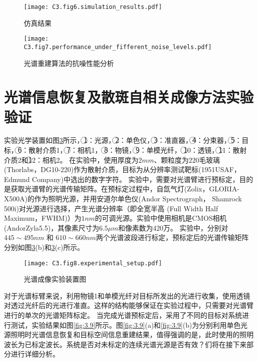 \begin{figure}[htp]
	\centering
	\texttt{[image: C3.fig6.simulation\_results.pdf]}
	\caption{仿真结果}
	\label{fig:3.6}
\end{figure}

\begin{figure}[htp]
	\centering
	\texttt{[image: C3.fig7.performance\_under\_fifferent\_noise\_levels.pdf]}
	\caption{光谱重建算法的抗噪性能分析}
	\label{fig:3.7}
\end{figure}

\section{光谱信息恢复及散斑自相关成像方法实验验证}

实验光学装置如图\ref{fig:3.8}所示，{\large \textcircled{\normalsize 1}}：光源，{\large \textcircled{\normalsize 2}}：单色仪，{\large \textcircled{\normalsize 3}}：准直器，{\large \textcircled{\normalsize 4}}：分束器，{\large \textcircled{\normalsize 5}}：目标，{\large \textcircled{\normalsize 6}}：散射介质1，{\large \textcircled{\normalsize 7}}：相机1，
{\large \textcircled{\normalsize 8}}：物镜，{\large \textcircled{\normalsize 9}}：单模光纤，
{\large \textcircled{\normalsize 10}}：透镜，{\large \textcircled{\normalsize 11}}：散射介质2和{\large \textcircled{\normalsize 12}}：相机2。
在实验中，使用厚度为$2mm$、颗粒度为$220$毛玻璃(Thorlabs，DG10-220)作为散射介质，目标为从分辨率测试靶标(1951USAF，Edmund Company)中选出的数字字符。
实验中，需要对光谱臂进行预标定，目的是获取光谱臂的光谱传输矩阵。在预标定过程中，自氙气灯(Zolix，GLORIA-X500A)的作为照明光源，并用安道尔单色仪(Andor Spectrograph， Shamrock 500i)对光源进行选择，产生光谱分辨率（即全宽半高
(Full Width Half Maximum，FWHM)）为$1 nm$的可调光源。实验中使用相机是CMOS相机(AndorZyla5.5)，其像素尺寸为$6.5\mu m$和像素数为420万。
实验中，分别对$445 \sim 495nm$ 和 $610 \sim 660nm$两个光谱波段进行标定，预标定后的光谱传输矩阵分别如图\ref{fig:3.8}(b)和\ref{fig:3.8}(c)所示。

\begin{figure}[htp]
	\centering
	\texttt{[image: C3.fig8.experimental\_setup.pdf]}
	\caption{光谱成像实验装置图}
	\label{fig:3.8}
\end{figure}

对于光谱标臂来说，利用物镜1和单模光纤对目标所发出的光进行收集，使用透镜对透过光纤后的光进行准直。这样的结构能够保证在实验过程中，只需要对光谱臂进行的单次的光谱矩阵标定。
当完成光谱预标定后，采用了不同的目标对系统进行测试，实验结果如图\ref{fig:3.9}所示。图\ref{fig:3.9}(a)和\ref{fig:3.9}(b)为分别利用单色光源照明时光谱信息恢复和目标空间信息重建结果，值得强调的是，此时使用的照明波长为已标定波长。系统是否对未标定的连续光谱光源是否有效？们将在接下来部分进行详细分析。


